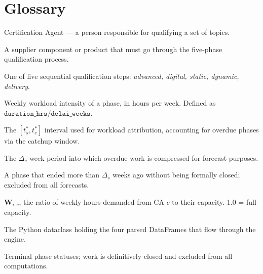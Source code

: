 \documentclass[12pt,a4paper]{report}
\DeclareMathOperator{\vh}{VH}
\begin{document}
\chapter*{Glossary}

\begin{description}[leftmargin=3.5cm, labelwidth=3cm]
  \item[CA] Certification Agent --- a person responsible for qualifying
        a set of topics.
  \item[Topic] A supplier component or product that must go through
        the five-phase qualification process.
  \item[Phase] One of five sequential qualification steps:
        \textit{advanced, digital, static, dynamic, delivery}.
  \item[$\vh$] Weekly workload intensity of a phase, in hours per week.
        Defined as $\texttt{duration\_hrs} / \texttt{delai\_weeks}$.
  \item[Effective window] The $[t_s^*, t_e^*]$ interval used for workload
        attribution, accounting for overdue phases via the catchup window.
  \item[Catchup window] The $\Delta_c$-week period into which overdue
        work is compressed for forecast purposes.
  \item[Stale phase] A phase that ended more than $\Delta_s$ weeks ago
        without being formally closed; excluded from all forecasts.
  \item[Workload fraction] $\mathbf{W}_{i,c}$, the ratio of weekly hours
        demanded from CA $c$ to their capacity. 1.0 = full capacity.
  \item[DataBundle] The Python dataclass holding the four parsed DataFrames
        that flow through the engine.
  \item[VAL / CANCELED] Terminal phase statuses; work is definitively
        closed and excluded from all computations.
\end{description}
\end{document}
